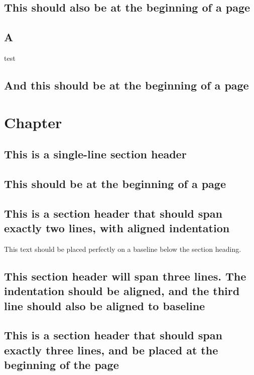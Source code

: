 \documentclass[baselinegrid,noprint,nocopyright]{uit-thesis-test}
\begin{document}
\section{This should also be at the beginning of a page}
\section{A}
test

\newpage
\section{And this should be at the beginning of a page}


\chapter{Chapter}
\lipsum[1]

\section{This is a single-line section header}
\lipsum[3-7]

\section{This should be at the beginning of a page}
\lipsum[8]

\section{This is a section header that should span exactly two lines, with aligned indentation}
This text should be placed perfectly on a baseline below the section heading.

\lipsum[9]

\section{This section header will span three lines. The indentation should be aligned, and the third line should also be aligned to baseline}
\lipsum[10-14]

\section{This is a section header that should span exactly three lines, and be placed at the beginning of the page}

\lipsum[15-17]
\end{document}

